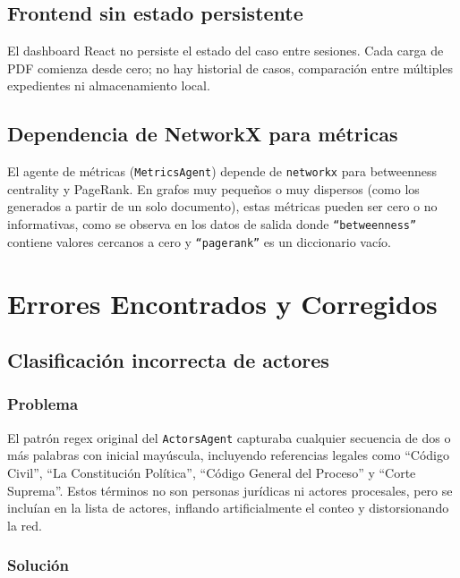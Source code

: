 \documentclass[12pt, letterpaper]{article}
\begin{document}
\subsection{Frontend sin estado persistente}

El dashboard React no persiste el estado del caso entre sesiones.
Cada carga de PDF comienza desde cero; no hay historial de casos,
comparación entre múltiples expedientes ni almacenamiento local.

\subsection{Dependencia de NetworkX para métricas}

El agente de métricas (\texttt{MetricsAgent}) depende de
\texttt{networkx} para betweenness centrality y PageRank. En grafos
muy pequeños o muy dispersos (como los generados a partir de un solo
documento), estas métricas pueden ser cero o no informativas, como
se observa en los datos de salida donde
\texttt{``betweenness''} contiene valores cercanos a cero y
\texttt{``pagerank''} es un diccionario vacío.

\section{Errores Encontrados y Corregidos}

\subsection{Clasificación incorrecta de actores}

\subsubsection*{Problema}

El patrón regex original del \texttt{ActorsAgent} capturaba cualquier
secuencia de dos o más palabras con inicial mayúscula, incluyendo
referencias legales como ``Código Civil'', ``La Constitución
Política'', ``Código General del Proceso'' y ``Corte Suprema''.
Estos términos no son personas jurídicas ni actores procesales, pero
se incluían en la lista de actores, inflando artificialmente el
conteo y distorsionando la red.

\subsubsection*{Solución}
\end{document}
